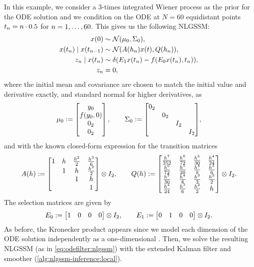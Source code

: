 \documentclass{mimosis}
\begin{document}
In this example, we consider a \(3\)-times integrated Wiener process as the prior for the ODE solution
and we condition on the ODE at \(N=60\) equidistant points
\(t_n = n\cdot 0.5\) for \(n=1, \dots, 60\).
This gives us the following NLGSSM:
\begin{subequations}
\begin{align}
  \st(0) &\sim \N( \mu_0, \Sigma_0 ), \\
  \st(t_\idxt) \mid \st(t_{\idxt-1}) &\sim \N(
    \transA(h_\idxt) \st(t), \transC(h_\idxt) ), \\
  \sobs_\idxt \mid \st(t_\idxt) &\sim \dirac(\proj{1} \st(t_\idxt) - \vf(\proj{0} \st(t_\idxt), t_\idxt)), \\
  \sobs_\idxt &= 0,
\end{align}
\end{subequations}
where the initial mean and covariance are chosen to match the initial value and derivative exactly, and standard normal for higher derivatives, as
\begin{equation}
  \mu_0 := \begin{bmatrix} y_0 \\ \vf(y_0, 0) \\ 0_2 \\ 0_2 \end{bmatrix},
\qquad
  \Sigma_0 := \mqty[\dmat{0_2, 0_2, I_2, I_2}],
\end{equation}
and with the known closed-form expression for the  transition matrices
\begin{equation}
  A(h) :=
    \begin{bmatrix}
      1 & h & \frac{h^2}{2} & \frac{h^3}{6} \\
        & 1 & h & \frac{h^2}{2} \\
        &   & 1 & h \\
        &   &   & 1
    \end{bmatrix} \otimes I_2,
\qquad
  Q(h) :=
    \begin{bmatrix}
      \frac{h^7}{252} & \frac{h^6}{72} & \frac{h^5}{30} & \frac{h^4}{24} \\
      \frac{h^6}{72} & \frac{h^5}{20} & \frac{h^4}{8} & \frac{h^3}{6} \\
      \frac{h^5}{30} & \frac{h^4}{8} & \frac{h^3}{3} & \frac{h^2}{2} \\
      \frac{h^4}{24} & \frac{h^3}{6} & \frac{h^2}{2} & h
    \end{bmatrix} \otimes I_2.
\end{equation}
The selection matrices are given by
\begin{equation}
  E_{0} := \begin{bmatrix} 1 & 0 & 0 & 0 \end{bmatrix} \otimes I_2,
\qquad
  E_{1} := \begin{bmatrix} 0 & 1 & 0 & 0 \end{bmatrix} \otimes I_2.
\end{equation}
As before, the Kronecker product appears since we model each dimension of the ODE solution independently as a one-dimensional .
Then, we solve the resulting NLGSSM (as in \cref{eq:odefilter:nlgssm})
with the extended Kalman filter and smoother (\cref{alg:nlgssm-inference:local}).
\end{document}
